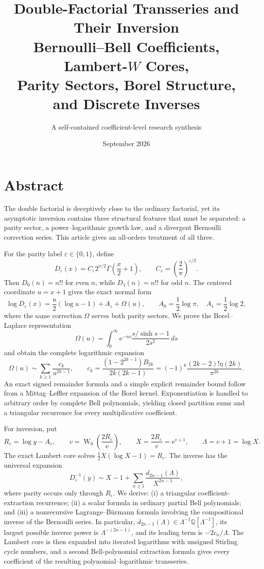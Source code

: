 \documentclass[11pt,a4paper,oneside]{book}
\title{\Huge\bfseries Double-Factorial Transseries and Their Inversion\\[3mm]
\Large Bernoulli--Bell Coefficients, Lambert-\(W\) Cores,\\
Parity Sectors, Borel Structure, and Discrete Inverses}
\author{A self-contained coefficient-level research synthesis}
\date{September 2026}
\newcommand{\Q}{\mathbb Q}
\newcommand{\e}{\mathrm e}
\newcommand{\W}{\operatorname W}
\newcommand{\eps}{\varepsilon}
\begin{document}
\frontmatter
\hypersetup{pageanchor=false}
\maketitle
\hypersetup{pageanchor=true}

\chapter*{Abstract}

The double factorial is deceptively close to the ordinary factorial, yet its
asymptotic inversion contains three structural features that must be separated:
a parity sector, a power--logarithmic growth law, and a divergent Bernoulli
correction series.  This article gives an all-orders treatment of all three.

For the parity label \(\eps\in\{0,1\}\), define
\[
 D_\eps(x)=C_\eps 2^{x/2}\Gamma\!\left(\frac{x}{2}+1\right),
 \qquad
 C_\eps=\left(\frac{2}{\pi}\right)^{\eps/2}.
\]
Then \(D_0(n)=n!!\) for even \(n\), while \(D_1(n)=n!!\) for odd \(n\).
The centered coordinate \(u=x+1\) gives the exact normal form
\[
 \log D_\eps(x)
 =\frac{u}{2}(\log u-1)+A_\eps+\Omega(u),
 \qquad
 A_0=\frac12\log\pi,\quad A_1=\frac12\log2,
\]
where the same correction \(\Omega\) serves both parity sectors.  We prove the
Borel--Laplace representation
\[
 \Omega(u)=\int_0^\infty \e^{-us}
 \frac{s/\sinh s-1}{2s^2}\,ds
\]
and obtain the complete logarithmic expansion
\[
 \Omega(u)\sim\sum_{k\ge1}\frac{c_k}{u^{2k-1}},
 \qquad
 c_k=
 \frac{(1-2^{2k-1})B_{2k}}{2k(2k-1)}
 =(-1)^k\frac{(2k-2)!\eta(2k)}{\pi^{2k}}.
\]
An exact signed remainder formula and a simple explicit remainder bound follow
from a Mittag--Leffler expansion of the Borel kernel.  Exponentiation is handled
to arbitrary order by complete Bell polynomials, yielding closed partition
sums and a triangular recurrence for every multiplicative coefficient.

For inversion, put
\[
 R_\eps=\log y-A_\eps,\qquad
 v=\W_0\!\left(\frac{2R_\eps}{\e}\right),\qquad
 X=\frac{2R_\eps}{v}=\e^{v+1},\qquad
 \Lambda=v+1=\log X.
\]
The exact Lambert core solves
\(\tfrac12X(\log X-1)=R_\eps\).  The inverse has the universal expansion
\[
 D_\eps^{-1}(y)
 \sim X-1+\sum_{n\ge1}
 \frac{d_{2n-1}(\Lambda)}{X^{2n-1}},
\]
where parity occurs only through \(R_\eps\).  We derive: (i) a triangular
coefficient-extraction recurrence; (ii) a scalar formula in ordinary partial
Bell polynomials; and (iii) a nonrecursive Lagrange--B\"urmann formula involving
the compositional inverse of the Bernoulli series.  In particular,
\(d_{2n-1}(\Lambda)\in\Lambda^{-1}\Q[\Lambda^{-1}]\), its largest possible
inverse power is \(\Lambda^{-(2n-1)}\), and its leading term is
\(-2c_n/\Lambda\).  The Lambert core is then expanded into iterated logarithms
with unsigned Stirling cycle numbers, and a second Bell-polynomial extraction
formula gives every coefficient of the resulting polynomial--logarithmic
transseries.
\end{document}
